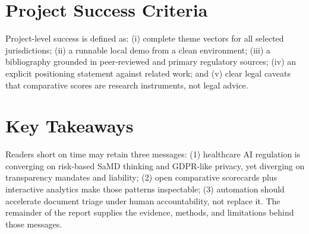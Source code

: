 \section{Project Success Criteria}
\label{sec:success}

Project-level success is defined as: (i) complete theme vectors for all selected jurisdictions; (ii) a runnable local demo from a clean environment; (iii) a bibliography grounded in peer-reviewed and primary regulatory sources; (iv) an explicit positioning statement against related work; and (v) clear legal caveats that comparative scores are research instruments, not legal advice.

\section{Key Takeaways}
\label{sec:jurybox}

Readers short on time may retain three messages: (1) healthcare AI regulation is converging on risk-based SaMD thinking and GDPR-like privacy, yet diverging on transparency mandates and liability; (2) open comparative scorecards plus interactive analytics make those patterns inspectable; (3) automation should accelerate document triage under human accountability, not replace it. The remainder of the report supplies the evidence, methods, and limitations behind those messages.
